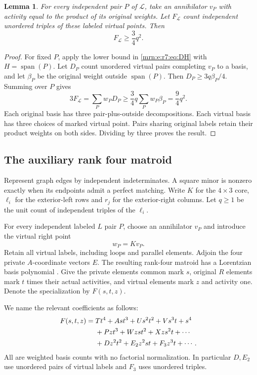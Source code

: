 \documentclass[11pt,a4paper]{article}
\newtheorem{lemma}[theorem]{Lemma}
\theoremstyle{remark}\newtheorem{remark}[theorem]{Remark}
\newcommand{\spn}{\operatorname{span}}     %
\begin{document}
\begin{lemma}\label{mrn:e:r7:lem:adjoint}
For every independent pair $P$ of $\mathcal L$, take an annihilator $v_P$ with activity equal to the product of its original weights. Let $F_{\mathcal L}$ count independent unordered triples of these labeled virtual points. Then
\begin{equation}\label{mrn:e:r7:eq:adjoint}
 F_{\mathcal L}\ge\frac34q^2.
\end{equation}
\end{lemma}
\begin{proof}
For fixed $P$, apply the lower bound in \eqref{mrn:e:r7:eq:DH} with $H=\spn(P)$. Let $D_P$ count unordered virtual pairs completing $v_P$ to a basis, and let $\beta_P$ be the original weight outside $\spn(P)$. Then $D_P\ge3q\beta_P/4$. Summing over $P$ gives
\[
 3F_{\mathcal L}=\sum_P w_PD_P
 \ge\frac34q\sum_Pw_P\beta_P=\frac94q^2.
\]
Each original basis has three pair-plus-outside decompositions. Each virtual basis has three choices of marked virtual point. Pairs sharing original labels retain their product weights on both sides. Dividing by three proves the result.
\end{proof}

\subsection{The auxiliary rank four matroid}
Represent graph edges by independent indeterminates. A square minor is nonzero exactly when its endpoints admit a perfect matching. Write $K$ for the $4\times3$ core, $\ell_i$ for the exterior-left rows and $r_j$ for the exterior-right columns. Let $q\ge1$ be the unit count of independent triples of the $\ell_i$.

For every independent labeled $L$ pair $P$, choose an annihilator $v_P$ and introduce the virtual right point
\[
 w_P=Kv_P.
\]
Retain all virtual labels, including loops and parallel elements. Adjoin the four private $A$-coordinate vectors $E$. The resulting rank-four matroid has a Lorentzian basis polynomial \cite{b:BH}. Give the private elements common mark $s$, original $R$ elements mark $t$ times their actual activities, and virtual elements mark $z$ and activity one. Denote the specialization by $F(s,t,z)$.

We name the relevant coefficients as follows:
\begin{align}
 F(s,t,z)={}&Tt^4+Ast^3+Us^2t^2+Vs^3t+s^4\notag\\
 &+Pzt^3+Wzst^2+Xzs^2t+\cdots\notag\\
 &+Dz^2t^2+E_2z^2st+F_3z^3t+\cdots.\label{mrn:e:r7:eq:F}
\end{align}
All are weighted basis counts with no factorial normalization. In particular $D,E_2$ use unordered pairs of virtual labels and $F_3$ uses unordered triples.
\end{document}
